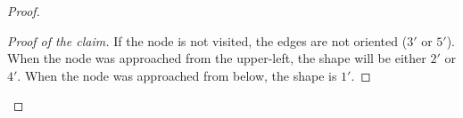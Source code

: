 \begin{proof}
\begin{claim*}
    \end{claim*}
    \begin{proof}[Proof of the claim]\renewcommand{\qedsymbol}{$\blacksquare$}
        If the node is not visited, the edges are not oriented (\( 3' \) or \( 5' \)).
        When the node was approached from the upper-left, the shape will be either \( 2' \) or \( 4' \).
        When the node was approached from below, the shape is \( 1' \).
    \end{proof}


\end{proof}

